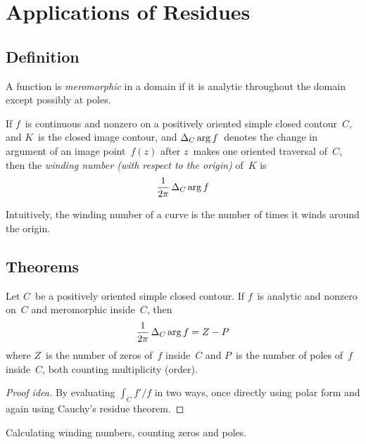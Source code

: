 %
%
%
\section{Applications of Residues}
\subsection*{Definition}
\begin{defn}
A function is \emph{meromorphic} in a domain if it is analytic throughout the domain except possibly at poles.
\end{defn}
\begin{defn}
If \(f\)~is continuous and nonzero on a positively oriented simple closed contour~\(C\), and \(K\)~is the closed image contour, and \(\mathop{\Delta_{C}\arg{f}}\)~denotes the change in argument of an image point~\(f(z)\) after \(z\)~makes one oriented traversal of~\(C\), then the \emph{winding number (with respect to the origin)} of~\(K\) is
\[\frac{1}{2\pi}\mathop{\Delta_{C}\arg{f}}\]
\end{defn}
\begin{rmk}
Intuitively, the winding number of a curve is the number of times it winds around the origin.
\end{rmk}
\subsection*{Theorems}
\begin{thm}
Let \(C\)~be a positively oriented simple closed contour. If \(f\)~is analytic and nonzero on~\(C\) and meromorphic inside~\(C\), then
\[\frac{1}{2\pi}\mathop{\Delta_{C}\arg{f}}=Z-P\]
where \(Z\)~is the number of zeros of~\(f\) inside~\(C\) and \(P\)~is the number of poles of~\(f\) inside~\(C\), both counting multiplicity (order).
\end{thm}
\begin{proof}[Proof idea]
By evaluating \(\int_C f'/f\) in two ways, once directly using polar form and again using Cauchy's residue theorem.
\end{proof}
\begin{app}
Calculating winding numbers, counting zeros and poles.
\end{app}

